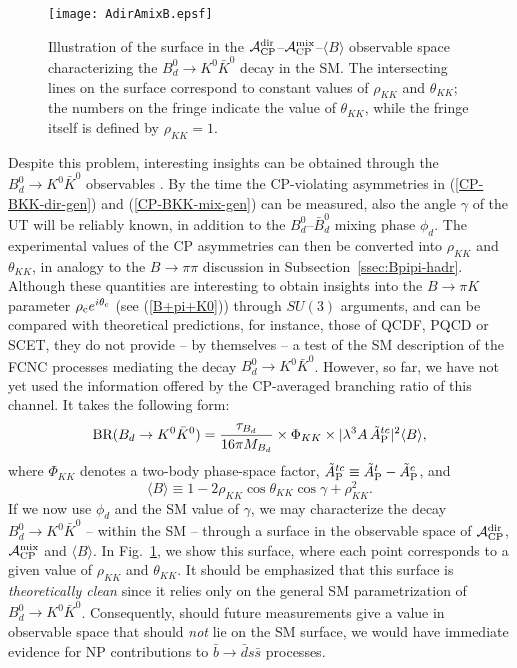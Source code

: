 \documentclass[12pt]{article}
\begin{document}
\begin{figure}
\vspace*{0.3truecm}
\begin{center}
\texttt{[image: AdirAmixB.epsf]}
\end{center}
\vspace*{-0.6truecm}
\caption{Illustration of the surface in the 
${\cal A}_{\rm CP}^{\rm dir}$--${\cal A}_{\rm CP}^{\rm mix}$--$\langle B \rangle$
observable space characterizing the $B^0_d\to K^0\bar K^0$ decay in the SM. 
The intersecting lines on the surface correspond to constant 
values of $\rho_{K\!K}$ and $\theta_{K\!K}$; the numbers on the fringe indicate 
the value of $\theta_{K\!K}$, while the fringe itself is defined by 
$\rho_{K\!K}=1$.}\label{fig:SM-surface}
\end{figure}


Despite this problem, interesting insights can be obtained through the
$B^0_d\to K^0\bar K^0$ observables \cite{FR1}.
By the time the CP-violating asymmetries in (\ref{CP-BKK-dir-gen}) and 
(\ref{CP-BKK-mix-gen}) can be measured, also the angle $\gamma$ of
the UT will be reliably known, in addition to the $B^0_d$--$\bar B^0_d$
mixing phase $\phi_d$. The experimental values of the CP asymmetries
can then be converted into $\rho_{K\!K}$ and $\theta_{K\!K}$, in analogy
to the $B\to\pi\pi$ discussion in Subsection~\ref{ssec:Bpipi-hadr}. Although 
these quantities are interesting to obtain insights into the $B\to\pi K$
parameter $\rho_{\rm c}e^{i\theta_{\rm c}}$ (see (\ref{B+pi+K0}))
through $SU(3)$ arguments, and can be compared  with theoretical predictions,  
for instance, those of QCDF, PQCD or SCET, they do not 
provide -- by themselves -- a test of the SM description of the 
FCNC processes mediating the decay $B^0_d\to K^0\bar K^0$. However, so far, 
we have not yet used the information offered by the CP-averaged branching 
ratio of this channel. It takes the following form:
\begin{equation}\label{BR-BKK-expr}
\mbox{BR}(B_d\to K^0\bar K^0)=\frac{\tau_{B_d}}{16\pi M_{B_d}}
\times \Phi_{KK} \times
|\lambda^3 A \, \tilde A_{\rm P}^{tc}|^2 \langle B \rangle,
\end{equation}
where $\Phi_{KK}$ denotes a two-body phase-space factor, 
$\tilde A_{\rm P}^{tc}\equiv \tilde A_{\rm P}^t-\tilde A_{\rm P}^c$, and
\begin{equation}\label{B-DEF}
\langle B \rangle\equiv 1-2\rho_{K\!K}\cos\theta_{K\!K}
\cos\gamma+\rho_{K\!K}^2.
\end{equation}
If we now use $\phi_d$ and the SM value of $\gamma$, we may characterize
the decay $B^0_d\to K^0\bar K^0$ -- within the SM -- through a surface in 
the observable space of ${\cal A}_{\rm CP}^{\rm dir}$, 
${\cal A}_{\rm CP}^{\rm mix}$ and $\langle B \rangle$. In 
Fig.~\ref{fig:SM-surface}, we show this surface, where each point 
corresponds to a given value of $\rho_{K\!K}$ and $\theta_{K\!K}$. It should 
be emphasized that this surface is {\it theoretically clean} since it 
relies only on the general SM parametrization of $B^0_d\to K^0\bar K^0$. 
Consequently, should future measurements give a value in observable space 
that should {\it not} lie on the SM surface, we would have immediate evidence 
for NP contributions to $\bar b\to \bar d s \bar s$ processes. 
\end{document}
